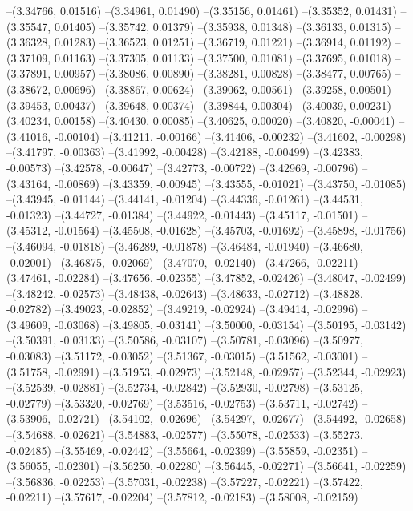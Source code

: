 --(3.34766, 0.01516)
--(3.34961, 0.01490)
--(3.35156, 0.01461)
--(3.35352, 0.01431)
--(3.35547, 0.01405)
--(3.35742, 0.01379)
--(3.35938, 0.01348)
--(3.36133, 0.01315)
--(3.36328, 0.01283)
--(3.36523, 0.01251)
--(3.36719, 0.01221)
--(3.36914, 0.01192)
--(3.37109, 0.01163)
--(3.37305, 0.01133)
--(3.37500, 0.01081)
--(3.37695, 0.01018)
--(3.37891, 0.00957)
--(3.38086, 0.00890)
--(3.38281, 0.00828)
--(3.38477, 0.00765)
--(3.38672, 0.00696)
--(3.38867, 0.00624)
--(3.39062, 0.00561)
--(3.39258, 0.00501)
--(3.39453, 0.00437)
--(3.39648, 0.00374)
--(3.39844, 0.00304)
--(3.40039, 0.00231)
--(3.40234, 0.00158)
--(3.40430, 0.00085)
--(3.40625, 0.00020)
--(3.40820, -0.00041)
--(3.41016, -0.00104)
--(3.41211, -0.00166)
--(3.41406, -0.00232)
--(3.41602, -0.00298)
--(3.41797, -0.00363)
--(3.41992, -0.00428)
--(3.42188, -0.00499)
--(3.42383, -0.00573)
--(3.42578, -0.00647)
--(3.42773, -0.00722)
--(3.42969, -0.00796)
--(3.43164, -0.00869)
--(3.43359, -0.00945)
--(3.43555, -0.01021)
--(3.43750, -0.01085)
--(3.43945, -0.01144)
--(3.44141, -0.01204)
--(3.44336, -0.01261)
--(3.44531, -0.01323)
--(3.44727, -0.01384)
--(3.44922, -0.01443)
--(3.45117, -0.01501)
--(3.45312, -0.01564)
--(3.45508, -0.01628)
--(3.45703, -0.01692)
--(3.45898, -0.01756)
--(3.46094, -0.01818)
--(3.46289, -0.01878)
--(3.46484, -0.01940)
--(3.46680, -0.02001)
--(3.46875, -0.02069)
--(3.47070, -0.02140)
--(3.47266, -0.02211)
--(3.47461, -0.02284)
--(3.47656, -0.02355)
--(3.47852, -0.02426)
--(3.48047, -0.02499)
--(3.48242, -0.02573)
--(3.48438, -0.02643)
--(3.48633, -0.02712)
--(3.48828, -0.02782)
--(3.49023, -0.02852)
--(3.49219, -0.02924)
--(3.49414, -0.02996)
--(3.49609, -0.03068)
--(3.49805, -0.03141)
--(3.50000, -0.03154)
--(3.50195, -0.03142)
--(3.50391, -0.03133)
--(3.50586, -0.03107)
--(3.50781, -0.03096)
--(3.50977, -0.03083)
--(3.51172, -0.03052)
--(3.51367, -0.03015)
--(3.51562, -0.03001)
--(3.51758, -0.02991)
--(3.51953, -0.02973)
--(3.52148, -0.02957)
--(3.52344, -0.02923)
--(3.52539, -0.02881)
--(3.52734, -0.02842)
--(3.52930, -0.02798)
--(3.53125, -0.02779)
--(3.53320, -0.02769)
--(3.53516, -0.02753)
--(3.53711, -0.02742)
--(3.53906, -0.02721)
--(3.54102, -0.02696)
--(3.54297, -0.02677)
--(3.54492, -0.02658)
--(3.54688, -0.02621)
--(3.54883, -0.02577)
--(3.55078, -0.02533)
--(3.55273, -0.02485)
--(3.55469, -0.02442)
--(3.55664, -0.02399)
--(3.55859, -0.02351)
--(3.56055, -0.02301)
--(3.56250, -0.02280)
--(3.56445, -0.02271)
--(3.56641, -0.02259)
--(3.56836, -0.02253)
--(3.57031, -0.02238)
--(3.57227, -0.02221)
--(3.57422, -0.02211)
--(3.57617, -0.02204)
--(3.57812, -0.02183)
--(3.58008, -0.02159)
